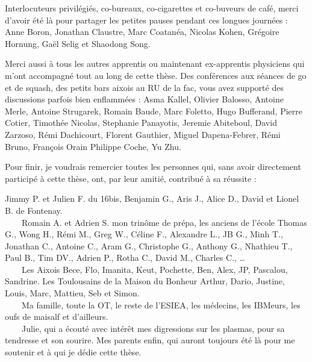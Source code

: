 Interlocuteurs privilégiés, co-bureaux, co-cigarettes et co-buveurs de café,
merci d'avoir été là pour partager les petites pauses pendant ces longues
journées :
Anne Boron, Jonathan Claustre, Marc Coatanéa, Nicolas Kohen, Grégoire Hornung, Gaël Selig et Shaodong Song.

Merci aussi à tous les autres apprentis ou maintenant ex-apprentis physiciens
qui m'ont accompagné tout au long de cette thèse. Des conférences aux séances de
go et de squash, des petits bars aixois au RU de la fac, vous avez supporté des
discussions parfois bien enflammées : Asma Kallel, Olivier Balosso, Antoine
Merle, Antoine Strugarek,
Romain Baude,
Marc Foletto,
Hugo Bufferand,
Pierre Cotier,
Timothée Nicolas,
Stephanie Panayotis,
Jeremie Abiteboul,
David Zarzoso,
Rémi Dachicourt,
Florent Gauthier,
Miguel Dapena-Febrer,
Rémi Bruno,
François Orain
Philippe Coche,
Yu Zhu.

Pour finir, je voudrais remercier toutes les personnes qui, sans avoir
directement participé à cette thèse, ont, par leur amitié, contribué à sa
réussite : 


Jimmy P. et Julien F. du 16bis, Benjamin
G., Aris J., Alice D., David et Lionel B. de Fontenay.
\\
\mbox{~~~~}Romain A. et Adrien S.
mon trinôme de prépa, les anciens de l'école Thomas G., Wong H., Rémi M., Greg
W., Céline F., Alexandre L., JB G., Minh T., Jonathan C., Antoine C., Aram G., Christophe G., Anthony G., Nhathieu T., Paul B., Tim DV., Adrien P., Rotha C.,
David M., Charles C., \ldots
\\
\mbox{~~~~}Les Aixois Bece, Flo, Imanita, Keut, Pochette,
Ben, Alex, JP, Pascalou, Sandrine. Les Toulousains de la
Maison du Bonheur Arthur, Dario, Justine, Louis, Marc, Mattieu, Seb et
Simon.
\\
\mbox{~~~~}Ma famille, toute la OT, le reste de l'ESIEA, les médecins, les
IBMeurs, les oufs de maisalf et d'ailleurs.
\\
\mbox{~~~~}Julie, qui a écouté avec intérêt mes digressions sur les plasmas,
pour sa tendresse et son sourire.
Mes parents enfin, qui auront toujours été là pour me soutenir et à qui je dédie
cette thèse.


